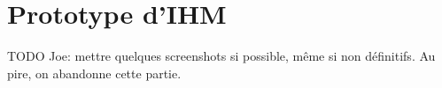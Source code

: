 
\section{Prototype d'IHM}
\label{section:ihm}

TODO Joe: mettre quelques screenshots si possible, même si non définitifs. Au pire, on abandonne cette partie.

